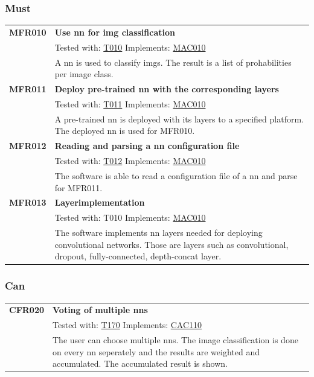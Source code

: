 \documentclass[parskip=full]{scrartcl}
\begin{document}
\subsubsection{Must}
\begin{tabular}{p{2cm}p{11.4cm}}
\textbf{MFR010}\hypertarget{MFR010} & \textbf{Use \gls{nn} for \gls{img} classification}\\
& Tested with: \hyperlink{T010}{T010} Implements: \hyperlink{MAC010}{MAC010} \\                                    
& A \gls{nn} is used to classify \glspl{img}. The result is a list of prohabilities per image class.\\
\textbf{MFR011}\hypertarget{MFR011} & \textbf{Deploy pre-trained \gls{nn} with the corresponding layers}\\
& Tested with: \hyperlink{T011}{T011} Implements: \hyperlink{MAC010}{MAC010} \\
& A pre-trained \gls{nn} is deployed with its layers to a specified platform. The deployed \gls{nn} is used for MFR010.\\
\textbf{MFR012} \hypertarget{MFR012}& \textbf{Reading and parsing a \gls{nn} configuration file}\\
& Tested with: \hyperlink{T012}{T012} Implements: \hyperlink{MAC010}{MAC010} \\
& The software is able to read a configuration file of a \gls{nn} and parse for MFR011.\\
\textbf{MFR013} & \textbf{Layerimplementation}\\
& Tested with: \hypertarget{T010}{T010} Implements: \hyperlink{MAC010}{MAC010}\\
& The software implements \gls{nn} layers needed for deploying convolutional networks. Those are layers such as convolutional, dropout, fully-connected, depth-concat layer.
\end{tabular}
\subsubsection{Can}
\begin{tabular}{p{2cm}p{11.4cm}}
\textbf{CFR020} \hypertarget{CFR020} & \textbf{Voting of multiple \glspl{nn}}\\
& Tested with: \hyperlink{T170}{T170} Implements: \hyperlink{CAC110}{CAC110} \\
& The user can choose multiple \glspl{nn}. The \gls{image classification} is done on every \gls{nn} seperately and the results are weighted and accumulated. The accumulated result is shown.\\
\end{tabular}
\end{document}
